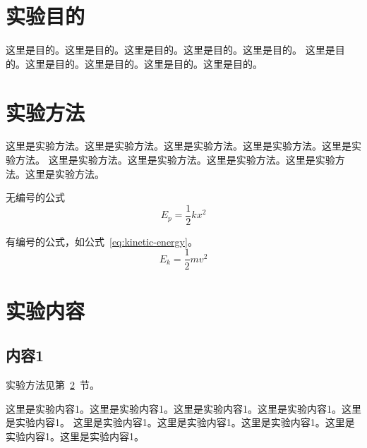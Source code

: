 
\setcounter{page}{1}


\titleformat{\section}{\raggedright\Large\bfseries}{\thesection}{1em}{}

\section{实验目的}

这里是目的。这里是目的。这里是目的。这里是目的。这里是目的。
这里是目的。这里是目的。这里是目的。这里是目的。这里是目的。

\section{实验方法}\label{sec:exp-method}

这里是实验方法。这里是实验方法。这里是实验方法。这里是实验方法。这里是实验方法。
这里是实验方法。这里是实验方法。这里是实验方法。这里是实验方法。这里是实验方法。

无编号的公式
\begin{equation*}
    E_p = \frac{1}{2} k x^2
\end{equation*}

有编号的公式，如公式~\ref{eq:kinetic-energy}。
\begin{equation}
    E_k = \frac{1}{2} m v^2
    \label{eq:kinetic-energy}
\end{equation}


\section{实验内容}

\subsection{内容1}

实验方法见第~\ref{sec:exp-method}~节。

这里是实验内容1。这里是实验内容1。这里是实验内容1。这里是实验内容1。这里是实验内容1。
这里是实验内容1。这里是实验内容1。这里是实验内容1。这里是实验内容1。这里是实验内容1。

